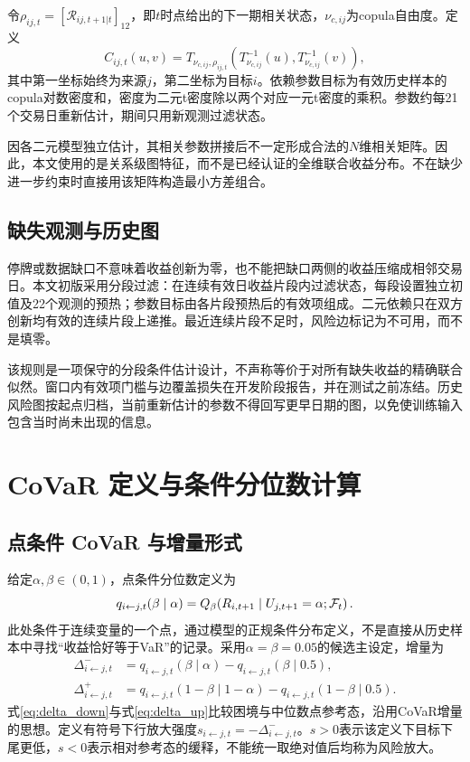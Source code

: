 令$\rho_{ij,t}=[\mathcal R_{ij,t+1|t}]_{12}$，即$t$时点给出的下一期相关状态，$\nu_{c,ij}$为copula自由度。定义
\begin{equation}\label{eq:tcopula}
C_{ij,t}(u,v)=T_{\nu_{c,ij},\rho_{ij,t}}
\left(T_{\nu_{c,ij}}^{-1}(u),T_{\nu_{c,ij}}^{-1}(v)\right),
\end{equation}
其中第一坐标始终为来源$j$，第二坐标为目标$i$。依赖参数目标为有效历史样本的copula对数密度和，密度为二元t密度除以两个对应一元t密度的乘积。参数约每21个交易日重新估计，期间只用新观测过滤状态。

因各二元模型独立估计，其相关参数拼接后不一定形成合法的$N$维相关矩阵。因此，本文使用的是关系级图特征，而不是已经认证的全维联合收益分布。不在缺少进一步约束时直接用该矩阵构造最小方差组合。

\subsection{缺失观测与历史图}
停牌或数据缺口不意味着收益创新为零，也不能把缺口两侧的收益压缩成相邻交易日。本文初版采用分段过滤：在连续有效日收益片段内过滤状态，每段设置独立初值及22个观测的预热；参数目标由各片段预热后的有效项组成。二元依赖只在双方创新均有效的连续片段上递推。最近连续片段不足时，风险边标记为不可用，而不是填零。

该规则是一项保守的分段条件估计设计，不声称等价于对所有缺失收益的精确联合似然。窗口内有效项门槛与边覆盖损失在开发阶段报告，并在测试之前冻结。历史风险图按起点归档，当前重新估计的参数不得回写更早日期的图，以免使训练输入包含当时尚未出现的信息。

\section{CoVaR 定义与条件分位数计算}
\subsection{点条件 CoVaR 与增量形式}
给定$\alpha,\beta\in(0,1)$，点条件分位数定义为
\begin{equation}\label{eq:point_covar}
q_{i\leftarrow j,t}(\beta\mid\alpha)
=Q_{\beta}\!\left(R_{i,t+1}\mid U_{j,t+1}=\alpha;\mathcal F_t\right).
\end{equation}
此处条件于连续变量的一个点，通过模型的正规条件分布定义，不是直接从历史样本中寻找“收益恰好等于VaR”的记录。采用$\alpha=\beta=0.05$的候选主设定，增量为
\begin{align}
\Delta^-_{i\leftarrow j,t}&=q_{i\leftarrow j,t}(\beta\mid\alpha)
-q_{i\leftarrow j,t}(\beta\mid0.5),\label{eq:delta_down}\\
\Delta^+_{i\leftarrow j,t}&=q_{i\leftarrow j,t}(1-\beta\mid1-\alpha)
-q_{i\leftarrow j,t}(1-\beta\mid0.5).\label{eq:delta_up}
\end{align}
式\eqref{eq:delta_down}与式\eqref{eq:delta_up}比较困境与中位数点参考态，沿用CoVaR增量的思想\cite{adrian2016}。定义有符号下行放大强度$s_{i\leftarrow j,t}=-\Delta^-_{i\leftarrow j,t}$。$s>0$表示该定义下目标下尾更低，$s<0$表示相对参考态的缓释，不能统一取绝对值后均称为风险放大。

